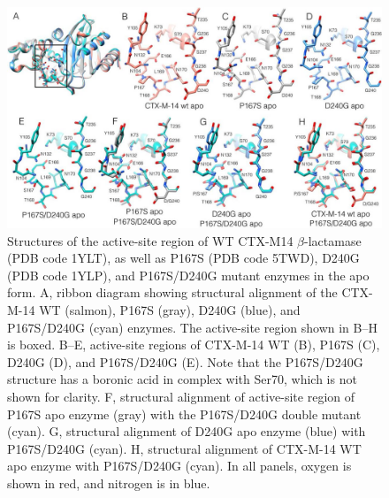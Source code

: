 \documentclass[../main.tex]{subfiles}
\begin{document}
        \begin{figure}[!htb] %
            \centering
            \includegraphics[width=5in]{ch2-fig5.jpg}
            \caption[Structures of the active-site region of WT CTX-M14 $\beta$-lactamase, as well as P167S, D240G, and P167S/D240G mutant enzymes in the apo form.]
                {Structures of the active-site region of WT CTX-M14 $\beta$-lactamase (PDB code 1YLT), as well as P167S (PDB code 5TWD), D240G (PDB code 1YLP), and P167S/D240G mutant enzymes in the apo form. A, ribbon diagram showing structural alignment of the CTX-M-14 WT (salmon), P167S (gray), D240G (blue), and P167S/D240G (cyan) enzymes. The active-site region shown in B–H is boxed. B–E, active-site regions of CTX-M-14 WT (B), P167S (C), D240G (D), and P167S/D240G (E). Note that the P167S/D240G structure has a boronic acid in complex with Ser70, which is not shown for clarity. F, structural alignment of active-site region of P167S apo enzyme (gray) with the P167S/D240G double mutant (cyan). G, structural alignment of D240G apo enzyme (blue) with P167S/D240G (cyan). H, structural alignment of CTX-M-14 WT apo enzyme with P167S/D240G (cyan). In all panels, oxygen is shown in red, and nitrogen is in blue.}
            \label{fig:ch2-fig5}
        \end{figure}
\end{document}
